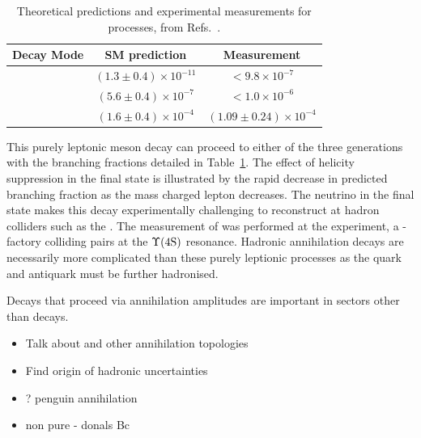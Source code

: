\begin{table}[h]
   \begin{center}
      \begin{tabular}{lcc}
         \hline

         Decay Mode                 & SM prediction & Measurement \\
         \hline 
         \decay{\Bp}{\ep\neue}      & $(1.3\pm0.4)\times10^{-11}$           & $<9.8\times10^{-7}$\\
         \decay{\Bp}{\mup\neum}     & $(5.6\pm0.4)\times10^{-7}$            & $<1.0\times10^{-6}$\\
         \decay{\Bp}{\taup\neut}    & $(1.6\pm0.4)\times10^{-4}$&           $(1.09\pm0.24)\times 10^{-4}$ \\
         \hline
      \end{tabular}
   \end{center}
   \caption{Theoretical predictions and experimental measurements for \decay{\Bp}{\ellp\neul} processes, from Refs.~\cite{PhysRevD.92.051102,PhysRevD.79.091101,SATOYAMA200767}.}
   \label{tab:Theory_B2ellnu}
\end{table}
This purely leptonic \Bp meson decay can proceed to either of the three generations with the branching fractions detailed in Table~\ref{tab:Theory_B2ellnu}. The effect of helicity suppression in the final state is illustrated by the rapid decrease in predicted branching fraction as the mass charged lepton decreases. The neutrino in the final state makes this decay experimentally challenging to reconstruct at hadron colliders such as the \lhc. The measurement of \decay{\Bp}{\taup\neut} was performed at the \belle experiment, a \B-factory colliding \ep\en pairs at the $\Upsilon(\text{4S})$ resonance. 
Hadronic annihilation decays are necessarily more complicated than these purely leptionic processes as the quark and antiquark must be further hadronised.

Decays that proceed via annihilation amplitudes are important in sectors other than \Bp decays. 


{\color{Red}
\begin{itemize}
\item Talk about \D and other annihilation topologies 
\item Find origin of hadronic uncertainties 
\item \decay{\Bz}{\Kp\Km}? penguin annihilation
\item non pure - donals Bc
\end{itemize}}

